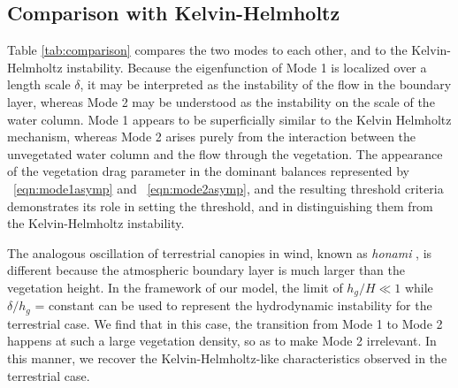 \documentclass{jfm}
\newcommand{\hg}{h_g}
\begin{document}
\subsection{Comparison with Kelvin-Helmholtz}
Table \ref{tab:comparison} compares the two modes to each other, and to the Kelvin-Helmholtz instability. 
Because the eigenfunction of Mode 1 is localized over a length scale $\delta$, it may be interpreted as the instability of the flow in the boundary layer, whereas Mode 2 may be understood as the instability on the scale of the water column. 
Mode 1 appears to be superficially similar to the Kelvin Helmholtz mechanism, whereas Mode 2 arises purely from the interaction between the unvegetated water column and the flow through the vegetation. 
The appearance of the vegetation drag parameter in the dominant balances represented by ~\eqref{eqn:mode1asymp} and ~\eqref{eqn:mode2asymp}, and the resulting threshold criteria demonstrates its role in setting the threshold, and in distinguishing them from the Kelvin-Helmholtz instability.

The analogous oscillation of terrestrial canopies in wind, known as \textit{honami} \cite{Inoue56,Raupach96}, is different because the atmospheric boundary layer is much larger than the vegetation height.
In the framework of our model, the limit of $\hg/H \ll 1$ while $\delta/\hg$ = constant can be used to represent the hydrodynamic instability for the terrestrial case.
We find that in this case, the transition from Mode 1 to Mode 2 happens at such a large vegetation density, so as to make Mode 2 irrelevant. 
In this manner, we recover the Kelvin-Helmholtz-like characteristics observed in the terrestrial case. 
\end{document}
